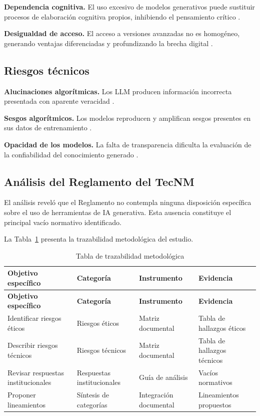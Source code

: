 \documentclass[review]{elsarticle}
\begin{document}
	\textbf{Dependencia cognitiva.} El uso excesivo de modelos generativos puede sustituir procesos de elaboración cognitiva propios, inhibiendo el pensamiento crítico \citep{guzmanvaldivia2024}.
	
	\textbf{Desigualdad de acceso.} El acceso a versiones avanzadas no es homogéneo, generando ventajas diferenciadas y profundizando la brecha digital \citep{vandijk2006}.
	
	\subsection{Riesgos técnicos}
	
	\textbf{Alucinaciones algorítmicas.} Los LLM producen información incorrecta presentada con aparente veracidad \citep{yan2023, bender2021}.
	
	\textbf{Sesgos algorítmicos.} Los modelos reproducen y amplifican sesgos presentes en sus datos de entrenamiento \citep{bender2021}.
	
	\textbf{Opacidad de los modelos.} La falta de transparencia dificulta la evaluación de la confiabilidad del conocimiento generado \citep{floridi2013, unesco2021}.
	
	\subsection{Análisis del Reglamento del TecNM}
	
	El análisis reveló que el Reglamento \citep{tecnm2023} no contempla ninguna disposición específica sobre el uso de herramientas de IA generativa. Esta ausencia constituye el principal vacío normativo identificado.
	
	La Tabla~\ref{tab:trazabilidad} presenta la trazabilidad metodológica del estudio.
	
	\begin{longtable}{p{3.0cm} p{2.8cm} p{3.0cm} p{3.2cm}}
		\caption{Tabla de trazabilidad metodológica}\label{tab:trazabilidad}\\
		\toprule
		\textbf{Objetivo específico} & \textbf{Categoría} & \textbf{Instrumento} & \textbf{Evidencia} \\
		\midrule
		\endfirsthead
		\toprule
		\textbf{Objetivo específico} & \textbf{Categoría} & \textbf{Instrumento} & \textbf{Evidencia} \\
		\midrule
		\endhead
		
		Identificar riesgos éticos & Riesgos éticos & Matriz documental & Tabla de hallazgos éticos \\
		\midrule
		Describir riesgos técnicos & Riesgos técnicos & Matriz documental & Tabla de hallazgos técnicos \\
		\midrule
		Revisar respuestas institucionales & Respuestas institucionales & Guía de análisis & Vacíos normativos \\
		\midrule
		Proponer lineamientos & Síntesis de categorías & Integración documental & Lineamientos propuestos \\
		\bottomrule
	\end{longtable}
	
\end{document}
